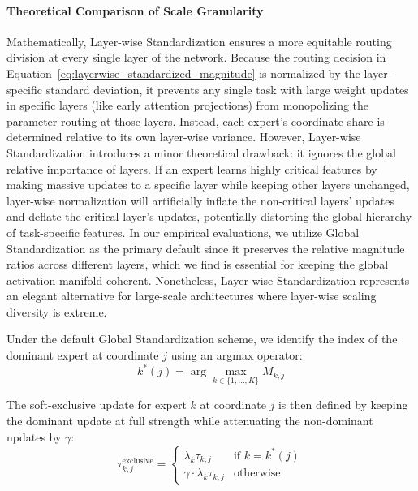 \paragraph{Theoretical Comparison of Scale Granularity}
Mathematically, Layer-wise Standardization ensures a more equitable routing division at every single layer of the network. Because the routing decision in Equation~\ref{eq:layerwise_standardized_magnitude} is normalized by the layer-specific standard deviation, it prevents any single task with large weight updates in specific layers (like early attention projections) from monopolizing the parameter routing at those layers. Instead, each expert's coordinate share is determined relative to its own layer-wise variance. However, Layer-wise Standardization introduces a minor theoretical drawback: it ignores the global relative importance of layers. If an expert learns highly critical features by making massive updates to a specific layer while keeping other layers unchanged, layer-wise normalization will artificially inflate the non-critical layers' updates and deflate the critical layer's updates, potentially distorting the global hierarchy of task-specific features. In our empirical evaluations, we utilize Global Standardization as the primary default since it preserves the relative magnitude ratios across different layers, which we find is essential for keeping the global activation manifold coherent. Nonetheless, Layer-wise Standardization represents an elegant alternative for large-scale architectures where layer-wise scaling diversity is extreme.

Under the default Global Standardization scheme, we identify the index of the dominant expert at coordinate $j$ using an argmax operator:
\begin{equation}
\label{eq:dominant_expert}
k^*(j) = \arg\max_{k \in \{1, \dots, K\}} M_{k, j}
\end{equation}

The soft-exclusive update for expert $k$ at coordinate $j$ is then defined by keeping the dominant update at full strength while attenuating the non-dominant updates by $\gamma$:
\begin{equation}
\label{eq:soft_exclusive_update}
\tau^{\text{exclusive}}_{k, j} = \begin{cases} \lambda_k \tau_{k, j} & \text{if } k = k^*(j) \\ \gamma \cdot \lambda_k \tau_{k, j} & \text{otherwise} \end{cases}
\end{equation}

